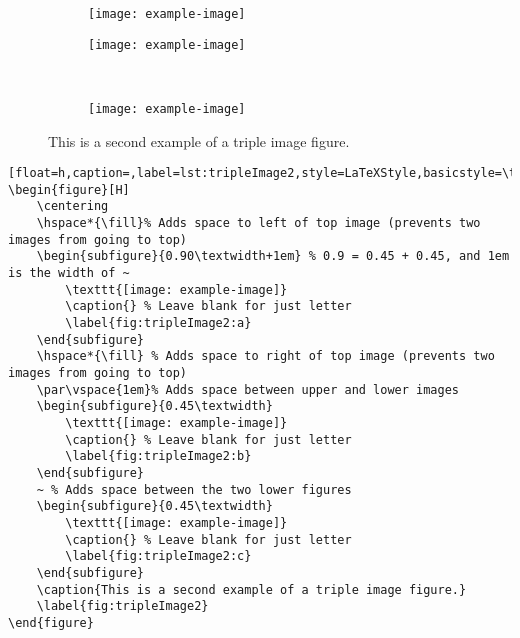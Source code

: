 		\vspace*{\fill}
		\begin{figure}[H]
			\centering
			\hspace*{\fill}%
			\begin{subfigure}{0.60\textwidth+1em} %
				\texttt{[image: example-image]}
				\caption{} %
				\label{fig:tripleImage2:a}
			\end{subfigure}
			\hspace*{\fill} %
			\par\vspace{1em}%
			\begin{subfigure}{0.30\textwidth}
				\texttt{[image: example-image]}
				\caption{} %
				\label{fig:tripleImage2:b}
			\end{subfigure}
			~ %
			\begin{subfigure}{0.30\textwidth}
				\texttt{[image: example-image]}
				\caption{} %
				\label{fig:tripleImage2:c}
			\end{subfigure}
			\caption{This is a second example of a triple image figure.}
			\label{fig:tripleImage2}
		\end{figure}
		\begin{lstlisting}[float=h,caption=,label=lst:tripleImage2,style=LaTeXStyle,basicstyle=\tiny\ttfamily,]
\begin{figure}[H]
	\centering
	\hspace*{\fill}% Adds space to left of top image (prevents two images from going to top)
	\begin{subfigure}{0.90\textwidth+1em} % 0.9 = 0.45 + 0.45, and 1em is the width of ~
		\texttt{[image: example-image]}
		\caption{} % Leave blank for just letter
		\label{fig:tripleImage2:a}
	\end{subfigure}
	\hspace*{\fill} % Adds space to right of top image (prevents two images from going to top)
	\par\vspace{1em}% Adds space between upper and lower images
	\begin{subfigure}{0.45\textwidth}
		\texttt{[image: example-image]}
		\caption{} % Leave blank for just letter
		\label{fig:tripleImage2:b}
	\end{subfigure}
	~ % Adds space between the two lower figures
	\begin{subfigure}{0.45\textwidth}
		\texttt{[image: example-image]}
		\caption{} % Leave blank for just letter
		\label{fig:tripleImage2:c}
	\end{subfigure}
	\caption{This is a second example of a triple image figure.}
	\label{fig:tripleImage2}
\end{figure}
		\end{lstlisting}
